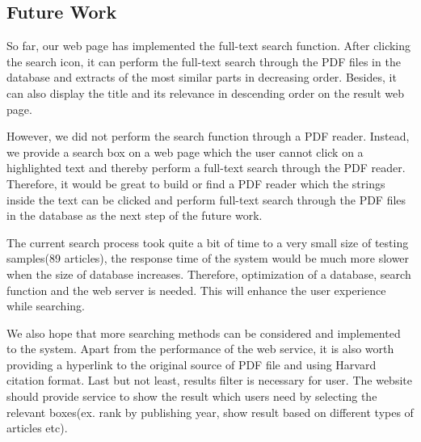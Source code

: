 
\subsection{Future Work}
So far, our web page has implemented the full-text search function. 
After clicking the search icon, it can perform the full-text search through the PDF files in the database and extracts of the most similar parts in decreasing order. 
Besides, it can also display the title and its relevance in descending order on the result web page.

However, we did not perform the search function through a PDF reader.
Instead, we provide a search box on a web page which the user cannot click on a highlighted text and thereby perform a full-text search through the PDF reader. 
Therefore, it would be great to build or find a PDF reader which the strings inside the text can be clicked and perform full-text search through the PDF files in the database as the next step of the future work.
 
The current search process took quite a bit of time to a very small size of testing samples(89 articles), the response time of the system would be much more slower when the size of database increases. 
Therefore, optimization of a database, search function and the web server is needed. 
This will enhance the user experience while searching.
 
We also hope that more searching methods can be considered and implemented to the system. 
Apart from the performance of the web service, it is also worth providing a hyperlink to the original source of PDF file and using Harvard citation format.
Last but not least, results filter is necessary for user. 
The website should provide service to show the result which users need by selecting the relevant boxes(ex. rank by publishing year, show result based on different types of articles etc).
